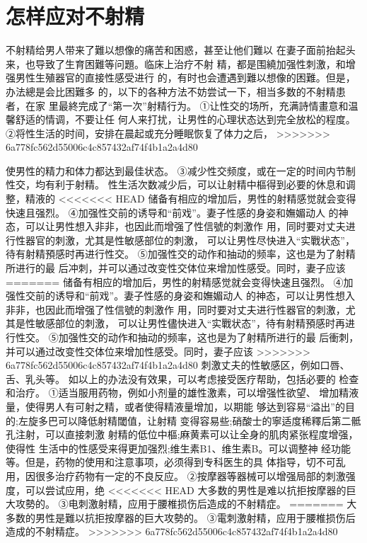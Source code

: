 \documentclass[12pt,UTF8]{ctexbook}
\begin{document}
\section{怎样应对不射精}
不射精给男人带来了難以想像的痛苦和困惑，甚至让他们難以
在妻子面前抬起头来，也导致了生育困難等问題。临床上治疗不射
精，都是围繞加强性刺激，和增强男性生殖器官的直接性感受进行
的，有时也会遭遇到難以想像的困難。但是，办法總是会比困難多
的，以下的各种方法不妨尝试一下，相当多数的不射精患者，在家
里最終完成了“第一次”射精行为。
①让性交的场所，充满詩情畫意和温馨舒适的情调，不要让任
何人来打扰，让男性的心理状态达到完全放松的程度。
②将性生活的时间，安排在晨起或充分睡眠恢复了体力之后，
>>>>>>> 6a778fc562d55006c4c857432af74f4b1a2a4d80

使男性的精力和体力都达到最佳状态。
③减少性交频度，或在一定的时间内节制性交，均有利于射精。
性生活次数减少后，可以让射精中樞得到必要的休息和调整，精液的
<<<<<<< HEAD
储备有相应的增加后，男性的射精感觉就会变得快速且强烈。
④加强性交前的诱导和“前戏”。妻子性感的身姿和嫵媚动人
的神态，可以让男性想入非非，也因此而增强了性信號的刺激作
用，同时要对丈夫进行性器官的刺激，尤其是性敏感部位的刺激，
可以让男性尽快进入“实戰状态”，待有射精預感时再进行性交。
⑤加强性交的动作和抽动的频率，这也是为了射精所进行的最
后冲刺，并可以通过改变性交体位来增加性感受。同时，妻子应该
=======
储备有相应的增加后，男性的射精感觉就会变得快速且强烈。
④加强性交前的诱导和“前戏”。妻子性感的身姿和嫵媚动人
的神态，可以让男性想入非非，也因此而增强了性信號的刺激作
用，同时要对丈夫进行性器官的刺激，尤其是性敏感部位的刺激，
可以让男性儘快进入“实戰状态”，待有射精預感时再进行性交。
⑤加强性交的动作和抽动的频率，这也是为了射精所进行的最
后衝刺，并可以通过改变性交体位来增加性感受。同时，妻子应该
>>>>>>> 6a778fc562d55006c4c857432af74f4b1a2a4d80
刺激丈夫的性敏感区，例如口唇、舌、乳头等。
如以上的办法没有效果，可以考虑接受医疗帮助，包括必要的
检查和治疗。
①适当服用药物，例如小剂量的雄性激素，可以增强性欲望、
增加精液量，使得男人有可射之精，或者使得精液量增加，以期能
够达到容易“溢出”的目的;左旋多巴可以降低射精閾值，让射精
变得容易些;硝酸士的寧适度稀釋后第二骶孔注射，可以直接刺激
射精的低位中樞;麻黄素可以让全身的肌肉紧张程度增强，使得性
生活中的性感受来得更加强烈;维生素B1、维生素B。可以调整神
经功能等。但是，药物的使用和注意事项，必须得到专科医生的具
体指导，切不可乱用，因很多治疗药物有一定的不良反应。
②按摩器等器械可以增强局部的刺激强度，可以尝试应用，绝
<<<<<<< HEAD
大多数的男性是难以抗拒按摩器的巨大攻勢的。
③电刺激射精，应用于腰椎损伤后造成的不射精症。
=======
大多数的男性是難以抗拒按摩器的巨大攻勢的。
③電刺激射精，应用于腰椎损伤后造成的不射精症。
>>>>>>> 6a778fc562d55006c4c857432af74f4b1a2a4d80
\end{document}
